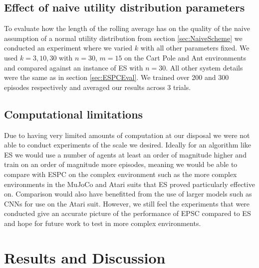 \subsection{Effect of naive utility distribution parameters}

To evaluate how the length of the rolling average has on the quality of the naive assumption of a normal utility distribution from section \ref{sec:NaiveScheme} we conducted an experiment where we varied $k$ with all other parameters fixed. We used $k=3,10,30$ with $n=30$, $m=15$ on the Cart Pole and Ant environments and compared against an instance of ES with $n=30$. All other system details were the same as in section \ref{sec:ESPCEval}. We trained over 200 and 300 episodes respectively and averaged our results across 3 trials.


    
\subsection{Computational limitations}
Due to having very limited amounts of computation at our disposal we were not able to conduct experiments of the scale we desired. Ideally for an algorithm like ES we would use a number of agents at least an order of magnitude higher and train on an order of magnitude more episodes, meaning we would be able to compare with ESPC on the complex environment such as the more complex environments in the MuJoCo \cite{MuJoCo} and Atari \cite{Atari} suits that ES proved particularly effective on. Comparison would also have benefitted from the use of larger models such as CNNs for use on the Atari suit. However, we still feel the experiments that were conducted give an accurate picture of the performance of EPSC compared to ES and hope for future work to test in more complex environments.

\section{Results and Discussion}

